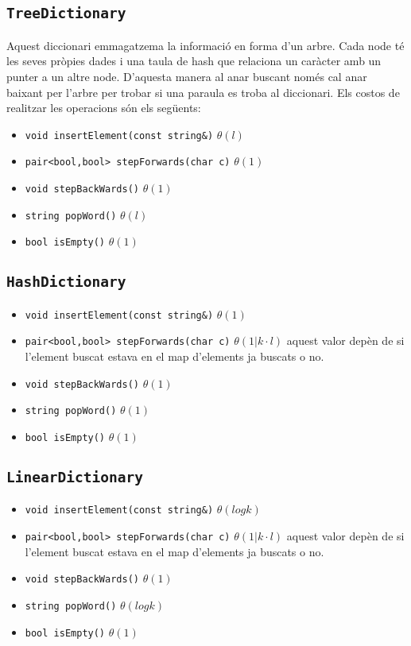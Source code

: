 \documentclass{article}
\begin{document}
\subsection{\texttt{TreeDictionary}}
Aquest diccionari emmagatzema la informació en forma d'un arbre. Cada node té les seves pròpies dades i una taula de hash que relaciona un caràcter amb un punter a un altre node. D'aquesta manera al anar buscant només cal anar baixant per l'arbre per trobar si una paraula es troba al diccionari. Els costos de realitzar les operacions són els següents:

\begin{itemize}
	\item \verb|void insertElement(const string&)| $\theta(l)$
	\item \verb|pair<bool,bool> stepForwards(char c)| $\theta(1)$
	\item \verb|void stepBackWards()| $\theta(1)$
	\item \verb|string popWord()| $\theta(l)$
	\item \verb|bool isEmpty()| $\theta(1)$
\end{itemize}

\subsection{\texttt{HashDictionary}}

\begin{itemize}
	\item \verb|void insertElement(const string&)| $\theta(1)$
	\item \verb|pair<bool,bool> stepForwards(char c)| $\theta(1 | k·l)$ aquest valor depèn de si l'element buscat estava en el map d'elements ja buscats o no.
	\item \verb|void stepBackWards()| $\theta(1)$
	\item \verb|string popWord()| $\theta(1)$
	\item \verb|bool isEmpty()| $\theta(1)$
\end{itemize}

\subsection{\texttt{LinearDictionary}}

\begin{itemize}
	\item \verb|void insertElement(const string&)| $\theta(log k)$
	\item \verb|pair<bool,bool> stepForwards(char c)| $\theta(1 | k·l)$ aquest valor depèn de si l'element buscat estava en el map d'elements ja buscats o no.
	\item \verb|void stepBackWards()| $\theta(1)$
	\item \verb|string popWord()| $\theta(log k)$
	\item \verb|bool isEmpty()| $\theta(1)$
\end{itemize}
\end{document}

